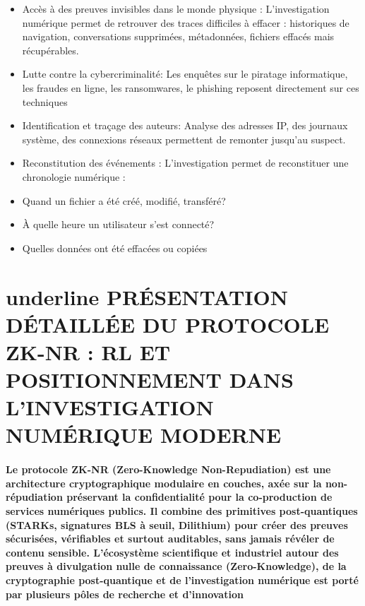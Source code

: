 \documentclass{article}
\begin{document}
\begin{itemize}

\item   Accès à des preuves invisibles dans le monde physique :  L’investigation numérique permet de retrouver des traces difficiles à effacer : historiques de navigation, conversations supprimées, métadonnées, fichiers effacés mais récupérables.

\item   Lutte contre la cybercriminalité:  Les enquêtes sur le piratage informatique, les fraudes en ligne, les ransomwares, le phishing reposent directement sur ces techniques

\item   Identification et traçage des auteurs: Analyse des adresses IP, des journaux système, des connexions réseaux permettent de remonter jusqu’au suspect.

\item  Reconstitution des événements :  L’investigation permet de reconstituer une chronologie numérique :
\end{itemize}
\begin{itemize}

 \item Quand un fichier a été créé, modifié, transféré?
 \item À quelle heure un utilisateur s’est connecté?
 \item Quelles données ont été effacées ou copiées


\end{itemize}


\section{underline{ PRÉSENTATION DÉTAILLÉE DU PROTOCOLE ZK-NR : RL ET POSITIONNEMENT DANS L’INVESTIGATION NUMÉRIQUE MODERNE}}

\paragraph{Le protocole ZK-NR (Zero-Knowledge Non-Repudiation) est une architecture cryptographique modulaire en couches, axée sur la non-répudiation préservant la confidentialité pour la co-production de services numériques publics.  Il combine des primitives post-quantiques (STARKs, signatures BLS à seuil, Dilithium) pour créer des preuves sécurisées, vérifiables et surtout auditables, sans jamais révéler de contenu sensible.
 L’écosystème scientifique et industriel autour des preuves à divulgation nulle de connaissance (Zero-Knowledge), de la cryptographie post-quantique et de l’investigation numérique est porté par plusieurs pôles de recherche et d’innovation}
\end{document}
